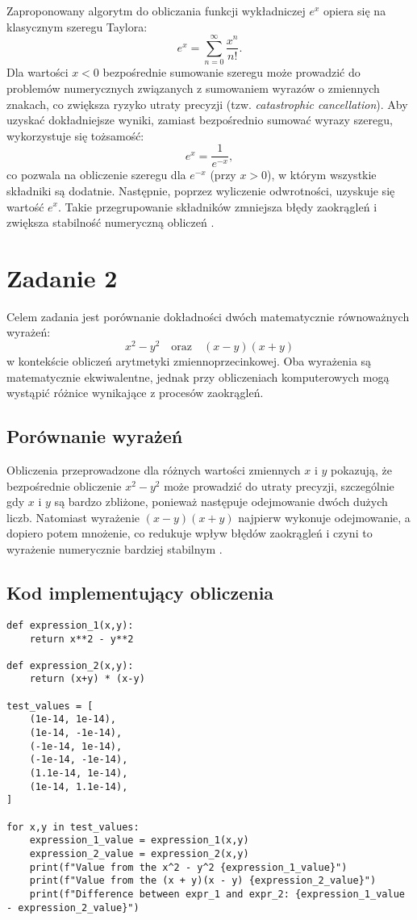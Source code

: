 \documentclass{article}
\begin{document}
Zaproponowany algorytm do obliczania funkcji wykładniczej \(e^x\) opiera się na klasycznym szeregu Taylora:
\[
e^x = \sum_{n=0}^{\infty} \frac{x^n}{n!}.
\]
Dla wartości \(x<0\) bezpośrednie sumowanie szeregu może prowadzić do problemów numerycznych związanych z sumowaniem wyrazów o zmiennych znakach, co zwiększa ryzyko utraty precyzji (tzw. \emph{catastrophic cancellation}). Aby uzyskać dokładniejsze wyniki, zamiast bezpośrednio sumować wyrazy szeregu, wykorzystuje się tożsamość:
\[
e^x = \frac{1}{e^{-x}},
\]
co pozwala na obliczenie szeregu dla \(e^{-x}\) (przy \(x>0\)), w którym wszystkie składniki są dodatnie. Następnie, poprzez wyliczenie odwrotności, uzyskuje się wartość \(e^x\). Takie przegrupowanie składników zmniejsza błędy zaokrągleń i zwiększa stabilność numeryczną obliczeń \cite{Higham2002,Goldberg1991}.

\section{Zadanie 2}

Celem zadania jest porównanie dokładności dwóch matematycznie równoważnych wyrażeń:
\[
x^2 - y^2 \quad \text{oraz} \quad (x - y)(x + y)
\]
w kontekście obliczeń arytmetyki zmiennoprzecinkowej. Oba wyrażenia są matematycznie ekwiwalentne, jednak przy obliczeniach komputerowych mogą wystąpić różnice wynikające z procesów zaokrągleń. 

\subsection{Porównanie wyrażeń}

Obliczenia przeprowadzone dla różnych wartości zmiennych \(x\) i \(y\) pokazują, że bezpośrednie obliczenie \(x^2 - y^2\) może prowadzić do utraty precyzji, szczególnie gdy \(x\) i \(y\) są bardzo zbliżone, ponieważ następuje odejmowanie dwóch dużych liczb. Natomiast wyrażenie \((x-y)(x+y)\) najpierw wykonuje odejmowanie, a dopiero potem mnożenie, co redukuje wpływ błędów zaokrągleń i czyni to wyrażenie numerycznie bardziej stabilnym \cite{Goldberg1991}.


\subsection{Kod implementujący obliczenia}

\begin{verbatim}
def expression_1(x,y):
    return x**2 - y**2

def expression_2(x,y):
    return (x+y) * (x-y)

test_values = [
    (1e-14, 1e-14),
    (1e-14, -1e-14),
    (-1e-14, 1e-14),
    (-1e-14, -1e-14),
    (1.1e-14, 1e-14),
    (1e-14, 1.1e-14),
]

for x,y in test_values:
    expression_1_value = expression_1(x,y)
    expression_2_value = expression_2(x,y)
    print(f"Value from the x^2 - y^2 {expression_1_value}")
    print(f"Value from the (x + y)(x - y) {expression_2_value}")
    print(f"Difference between expr_1 and expr_2: {expression_1_value - expression_2_value}")
\end{verbatim}
\end{document}
